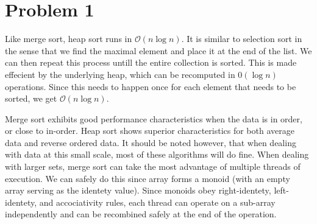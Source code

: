 \documentclass{article}
\newenvironment{problem}[1]{
  \nobreak\section*{Problem #1}
}{}
\begin{document}
\begin{problem}{1}
    \begin{table}[htbp]
      \caption{\label{tab:table-2}Test Data (0-1999)}
    \end{table}

    Like merge sort, heap sort runs in $\mathcal{O}(n\log{n})$.  It is similar
    to selection sort in the sense that we find the maximal element and place
    it at the end of the list.  We can then repeat this process untill the
    entire collection is sorted.  This is made effecient by the underlying heap,
    which can be recomputed in $\mathcal{0}(\log{n})$ operations.  Since this
    needs to happen once for each element that needs to be sorted, we get
    $\mathcal{O}(n\log{n})$.

    Merge sort exhibits good performance characteristics when the data is
    in order, or close to in-order.  Heap sort shows superior characteristics
    for both average data and reverse ordered data.  It should be noted
    however, that when dealing with data at this small scale, most of these
    algorithms will do fine.  When dealing with larger sets, merge sort can take
    the most advantage of multiple threads of execution.  We can safely do this
    since array forms a monoid (with an empty array serving as the identety value).
    Since monoids obey right-identety, left-identety, and accociativity rules,
    each thread can operate on a sub-array independently and can be recombined
    safely at the end of the operation.
  \end{problem}
\end{document}
